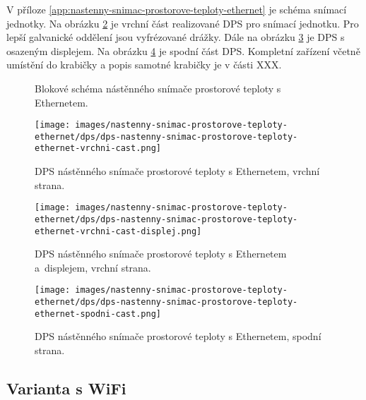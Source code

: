 V příloze \ref{app:nastenny-snimac-prostorove-teploty-ethernet} je schéma snímací jednotky. Na obrázku \ref{fig:dps-nastenny-snimac-prostorove-teploty-ethernet-vrchni-cast} je vrchní část realizované DPS pro snímací jednotku. Pro lepší galvanické oddělení jsou vyfrézované drážky. Dále na obrázku \ref{fig:dps-nastenny-snimac-prostorove-teploty-ethernet-vrchni-cast-displej} je DPS s osazeným displejem. Na obrázku \ref{fig:dps-nastenny-snimac-prostorove-teploty-ethernet-spodni-cast} je spodní část DPS. Kompletní zařízení včetně umístění do krabičky a popis samotné krabičky je v části XXX.

\begin{figure}[H]
    \centering
    \def\svgwidth{\columnwidth}
    
    \caption[]{Blokové schéma nástěnného snímače prostorové teploty s Ethernetem.}
    \label{fig:blokove-schema-nastenny-snimac-teploty-ethernet}
\end{figure}

\begin{figure}[H]
    \centering
    \texttt{[image: images/nastenny-snimac-prostorove-teploty-ethernet/dps/dps-nastenny-snimac-prostorove-teploty-ethernet-vrchni-cast.png]}
    \caption{DPS nástěnného snímače prostorové teploty s Ethernetem, vrchní strana.}
    \label{fig:dps-nastenny-snimac-prostorove-teploty-ethernet-vrchni-cast}
\end{figure}

\begin{figure}[H]
    \centering
    \texttt{[image: images/nastenny-snimac-prostorove-teploty-ethernet/dps/dps-nastenny-snimac-prostorove-teploty-ethernet-vrchni-cast-displej.png]}
    \caption{DPS nástěnného snímače prostorové teploty s Ethernetem a~displejem, vrchní strana.}
    \label{fig:dps-nastenny-snimac-prostorove-teploty-ethernet-vrchni-cast-displej}
\end{figure}

\begin{figure}[H]
    \centering
    \texttt{[image: images/nastenny-snimac-prostorove-teploty-ethernet/dps/dps-nastenny-snimac-prostorove-teploty-ethernet-spodni-cast.png]}
    \caption{DPS nástěnného snímače prostorové teploty s Ethernetem, spodní strana.}
    \label{fig:dps-nastenny-snimac-prostorove-teploty-ethernet-spodni-cast}
\end{figure}


\subsection{Varianta s WiFi}
\label{sec:wifi-modul}

